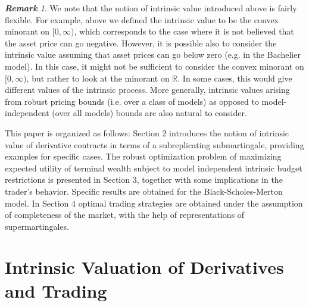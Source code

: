 \documentclass[a4paper]{amsart}
\theoremstyle{definition}
\theoremstyle{remark}
\newtheorem{remark}[theorem]{\textbf{Remark}}
\numberwithin{equation}{section}
\newcommand{\R}{\mathbb{R}}
\begin{document}
\begin{remark}
  We note that the notion of intrinsic value introduced above is fairly flexible. For example, above we defined the intrinsic value to be the convex minorant on $[0,\infty)$, which corresponds to the case where it is not believed that the asset price can go negative. However, it is possible also to consider the intrinsic value assuming that asset prices can go below zero (e.g. in the Bachelier model). In this case, it might not be sufficient to consider the convex minorant on $[0,\infty)$, but rather to look at the minorant on $\R$. In some cases, this would give different values of the intrinsic process. More generally, intrinsic values arising from robust pricing bounds (i.e. over a class of models) as opposed to model-independent (over all models) bounds are also natural to consider.
\end{remark}

This paper is organized as follows: Section 2 introduces the notion of intrinsic value of derivative contracts  in terms of a subreplicating submartingale, providing examples for specific
cases.   The robust optimization problem of maximizing  expected utility of terminal wealth subject to model independent  intrinsic budget restrictions is presented in Section 3, together with some implications in the trader's behavior. Specific results are obtained for the Black-Scholes-Merton model. In Section 4 optimal trading strategies are obtained under the assumption of completeness of the market, with the help  of representations of supermartingales.

\section{Intrinsic Valuation of Derivatives and Trading}
\end{document}
